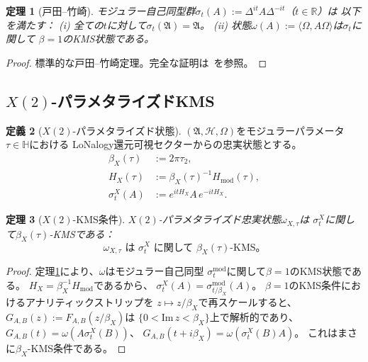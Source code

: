 \documentclass[12pt]{article}
\theoremstyle{plain}
\newtheorem{theorem}{定理}[section]
\theoremstyle{definition}
\newtheorem{definition}[theorem]{定義}
\numberwithin{equation}{section}
\newcommand{\R}{\mathbb{R}}
\newcommand{\HH}{\mathbb{H}}
\newcommand{\fA}{\mathfrak{A}}
\begin{document}
\begin{theorem}[戸田--竹崎]\label{thm:TT}
モジュラー自己同型群$\sigma_t(A):=\Delta^{it}A\Delta^{-it}$（$t\in\R$）は
以下を満たす：
(i) 全ての$t$に対して$\sigma_t(\fA)=\fA$。
(ii) 状態$\omega(A):=\langle\Omega,A\Omega\rangle$は$\sigma_t$に関して
$\beta=1$のKMS状態である。
\end{theorem}

\begin{proof}
標準的な戸田--竹崎定理。完全な証明は~\cite{BratteliRobinson}を参照。
\end{proof}

\subsection{$X(2)$-パラメタライズドKMS}

\begin{definition}[$X(2)$-パラメタライズド状態]
$(\fA,\mathcal{H},\Omega)$をモジュラーパラメータ$\tau\in\HH$における
LoNalogy還元可視セクターからの忠実状態とする。
\begin{align}
\beta_X(\tau) &:= 2\pi\tau_2,\\
H_X(\tau) &:= \beta_X(\tau)^{-1}H_{\mathrm{mod}}(\tau),\\
\sigma_t^X(A) &:= e^{itH_X}A\,e^{-itH_X}.
\end{align}
\end{definition}

\begin{theorem}[$X(2)$-KMS条件]\label{thm:kms}
$X(2)$-パラメタライズド忠実状態$\omega_{X,\tau}$は
$\sigma_t^X$に関して$\beta_X(\tau)$-KMSである：
\begin{equation}
\boxed{\omega_{X,\tau}\text{ は }\sigma_t^X\text{ に関して }\beta_X(\tau)\text{-KMS。}}
\end{equation}
\end{theorem}

\begin{proof}
定理\ref{thm:TT}により、$\omega$はモジュラー自己同型
$\sigma_t^{\mathrm{mod}}$に関して$\beta=1$のKMS状態である。
$H_X=\beta_X^{-1}H_{\mathrm{mod}}$であるから、
$\sigma_t^X(A)=\sigma_{t/\beta_X}^{\mathrm{mod}}(A)$。
$\beta=1$のKMS条件におけるアナリティックストリップを
$z\mapsto z/\beta_X$で再スケールすると、$G_{A,B}(z):=F_{A,B}(z/\beta_X)$は
$\{0<\mathrm{Im}\,z<\beta_X\}$上で解析的であり、
$G_{A,B}(t)=\omega(A\sigma_t^X(B))$、
$G_{A,B}(t+i\beta_X)=\omega(\sigma_t^X(B)A)$。
これはまさに$\beta_X$-KMS条件である。
\end{proof}
\end{document}
